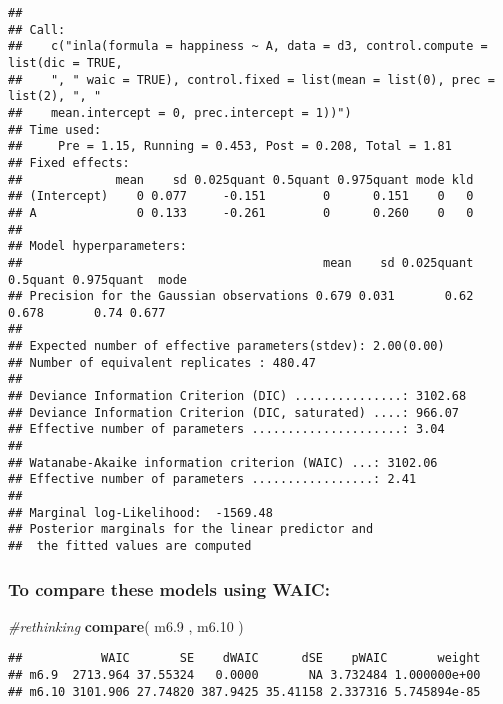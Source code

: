 \documentclass[
]{article}
\newenvironment{Shaded}{\begin{snugshade}}{\end{snugshade}}
\newcommand{\CommentTok}[1]{\textcolor[rgb]{0.56,0.35,0.01}{\textit{#1}}}
\newcommand{\FloatTok}[1]{\textcolor[rgb]{0.00,0.00,0.81}{#1}}
\newcommand{\KeywordTok}[1]{\textcolor[rgb]{0.13,0.29,0.53}{\textbf{#1}}}
\newcommand{\NormalTok}[1]{#1}
\newcommand{\OperatorTok}[1]{\textcolor[rgb]{0.81,0.36,0.00}{\textbf{#1}}}
\begin{document}
\begin{verbatim}
## 
## Call:
##    c("inla(formula = happiness ~ A, data = d3, control.compute = list(dic = TRUE, 
##    ", " waic = TRUE), control.fixed = list(mean = list(0), prec = list(2), ", " 
##    mean.intercept = 0, prec.intercept = 1))") 
## Time used:
##     Pre = 1.15, Running = 0.453, Post = 0.208, Total = 1.81 
## Fixed effects:
##             mean    sd 0.025quant 0.5quant 0.975quant mode kld
## (Intercept)    0 0.077     -0.151        0      0.151    0   0
## A              0 0.133     -0.261        0      0.260    0   0
## 
## Model hyperparameters:
##                                          mean    sd 0.025quant 0.5quant 0.975quant  mode
## Precision for the Gaussian observations 0.679 0.031       0.62    0.678       0.74 0.677
## 
## Expected number of effective parameters(stdev): 2.00(0.00)
## Number of equivalent replicates : 480.47 
## 
## Deviance Information Criterion (DIC) ...............: 3102.68
## Deviance Information Criterion (DIC, saturated) ....: 966.07
## Effective number of parameters .....................: 3.04
## 
## Watanabe-Akaike information criterion (WAIC) ...: 3102.06
## Effective number of parameters .................: 2.41
## 
## Marginal log-Likelihood:  -1569.48 
## Posterior marginals for the linear predictor and
##  the fitted values are computed
\end{verbatim}

\hypertarget{to-compare-these-models-using-waic}{%
\subsubsection{To compare these models using
WAIC:}\label{to-compare-these-models-using-waic}}

\begin{Shaded}
\begin{Highlighting}[]
\CommentTok{#rethinking}
 \KeywordTok{compare}\NormalTok{( m6}\FloatTok{.9}\NormalTok{ , m6}\FloatTok{.10}\NormalTok{ )}
\end{Highlighting}
\end{Shaded}

\begin{verbatim}
##           WAIC       SE    dWAIC      dSE    pWAIC       weight
## m6.9  2713.964 37.55324   0.0000       NA 3.732484 1.000000e+00
## m6.10 3101.906 27.74820 387.9425 35.41158 2.337316 5.745894e-85
\end{verbatim}

\begin{Shaded}
\end{Shaded}
\end{document}
